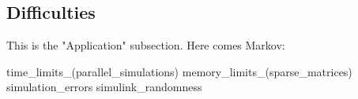 \subsection{Difficulties}

This is the "Application" subsection. Here comes Markov:

{time_limits_(parallel_simulations)}
{memory_limits_(sparse_matrices)}
{simulation_errors}
{simulink_randomness}
